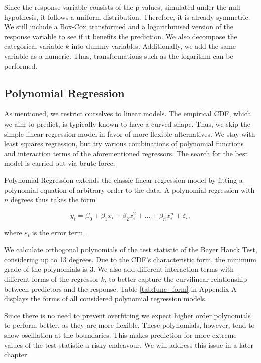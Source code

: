 \documentclass[12pt,a4paper]{article}
\begin{document}
Since the response variable consists of the p-values, simulated under
the null hypothesis, it follows a uniform distribution. Therefore, it is
already symmetric. We still include a Box-Cox transformed and a
logarithmised version of the response variable to see if it benefits the
prediction. We also decompose the categorical variable \(k\) into dummy
variables. Additionally, we add the same variable as a numeric. Thus,
transformations such as the logarithm can be performed.

\hypertarget{polynomial-regression}{%
\subsection{Polynomial Regression}\label{polynomial-regression}}

As mentioned, we restrict ourselves to linear models. The empirical
\ac{CDF}, which we aim to predict, is typically known to have a curved
shape. Thus, we skip the simple linear regression model in favor of more
flexible alternatives. We stay with least squares regression, but try
various combinations of polynomial functions and interaction terms of
the aforementioned regressors. The search for the best model is carried
out via brute-force.

Polynomial Regression extends the classic linear regression model by
fitting a polynomial equation of arbitrary order to the data. A
polynomial regression with \(n\) degrees thus takes the form

\begin{equation}
    y_i = \beta_0 + \beta_1 x_i + \beta_2 x_i^2 + ... + \beta_n x_i^n + \varepsilon_i,
\label{eq:7}
\end{equation}

where \(\varepsilon_i\) is the error term \autocite{James2013}.

We calculate orthogonal polynomials of the test statistic of the Bayer
Hanck Test, considering up to 13 degrees. Due to the \ac{CDF}'s
characteristic form, the minimum grade of the polynomials is 3. We also
add different interaction terms with different forms of the regressor
\(k\), to better capture the curvilinear relationship between predictors
and the response. Table \ref{tab:func_form} in Appendix A displays the
forms of all considered polynomial regression models.

Since there is no need to prevent overfitting we expect higher order
polynomials to perform better, as they are more flexible. These
polynomials, however, tend to show oscillation at the boundaries. This
makes prediction for more extreme values of the test statistic a risky
endeavour. We will address this issue in a later chapter.
\end{document}
